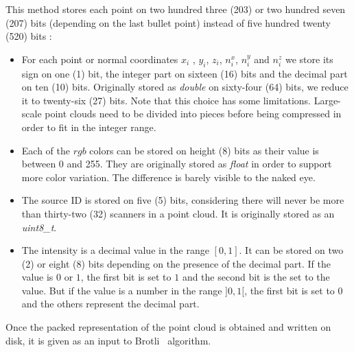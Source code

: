 This method stores each point on two hundred three (203) or two hundred seven (207) bits (depending on the last bullet point) instead of five hundred twenty (520) bits :
\begin{itemize}
\item For each point or normal coordinates $x_i$ , $y_i$, $z_i$, $n_i^x$, $n_i^y$ and $n_i^z$ we store its sign on one (1) bit, the integer part on sixteen (16) bits and the decimal part on ten (10) bits. Originally stored as \emph{double} on sixty-four (64) bits, we reduce it to twenty-six (27) bits. Note that this choice has some limitations. Large-scale point clouds need to be divided into pieces before being compressed in order to fit in the integer range.
\item Each of the $rgb$ colors can be stored on height (8) bits as their value is between 0 and 255. They are originally stored as \emph{float} in order to support more color variation. The difference is barely visible to the naked eye.
\item The source ID is stored on five (5) bits, considering there will never be more than thirty-two (32) scanners in a point cloud. It is originally stored as an \emph{uint8\_t}.
\item The intensity is a decimal value in the range $[0, 1]$. It can be stored on two (2) or eight (8) bits depending on the presence of the decimal part. If the value is $0$ or $1$, the first bit is set to $1$ and the second bit is the set to the value. But if the value is a number in the range $]0, 1[$, the first bit is set to $0$ and the others represent the decimal part.
\end{itemize}

Once the packed representation of the point cloud is obtained and written on disk, it is given as an input to Brotli~\cite{brotli} algorithm.


